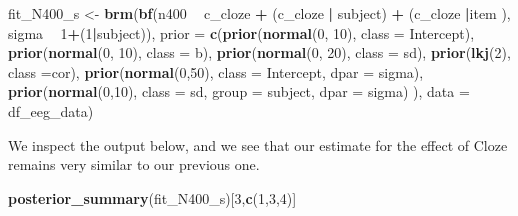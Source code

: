 \documentclass[12pt,]{krantz}
\newenvironment{Shaded}{\begin{snugshade}}{\end{snugshade}}
\newcommand{\DataTypeTok}[1]{\textcolor[rgb]{0.13,0.29,0.53}{#1}}
\newcommand{\DecValTok}[1]{\textcolor[rgb]{0.00,0.00,0.81}{#1}}
\newcommand{\KeywordTok}[1]{\textcolor[rgb]{0.13,0.29,0.53}{\textbf{#1}}}
\newcommand{\NormalTok}[1]{#1}
\newcommand{\OperatorTok}[1]{\textcolor[rgb]{0.81,0.36,0.00}{\textbf{#1}}}
\newcommand{\StringTok}[1]{\textcolor[rgb]{0.31,0.60,0.02}{#1}}
\theoremstyle{definition}
\theoremstyle{definition}
\theoremstyle{definition}
\theoremstyle{remark}
\begin{document}
\begin{Shaded}
\begin{Highlighting}[]
\NormalTok{fit_N400_s <-}\StringTok{ }\KeywordTok{brm}\NormalTok{(}\KeywordTok{bf}\NormalTok{(n400 }\OperatorTok{~}\StringTok{ }\NormalTok{c_cloze }\OperatorTok{+}\StringTok{ }\NormalTok{(c_cloze }\OperatorTok{|}\StringTok{ }\NormalTok{subject) }\OperatorTok{+}\StringTok{ }\NormalTok{(c_cloze }\OperatorTok{|}\NormalTok{item ),}
\NormalTok{                       sigma }\OperatorTok{~}\StringTok{ }\DecValTok{1}\OperatorTok{+}\NormalTok{(}\DecValTok{1}\OperatorTok{|}\NormalTok{subject)),}
                  \DataTypeTok{prior =}
                      \KeywordTok{c}\NormalTok{(}\KeywordTok{prior}\NormalTok{(}\KeywordTok{normal}\NormalTok{(}\DecValTok{0}\NormalTok{, }\DecValTok{10}\NormalTok{), }\DataTypeTok{class =}\NormalTok{ Intercept),}
                        \KeywordTok{prior}\NormalTok{(}\KeywordTok{normal}\NormalTok{(}\DecValTok{0}\NormalTok{, }\DecValTok{10}\NormalTok{), }\DataTypeTok{class =}\NormalTok{ b),}
                        \KeywordTok{prior}\NormalTok{(}\KeywordTok{normal}\NormalTok{(}\DecValTok{0}\NormalTok{, }\DecValTok{20}\NormalTok{), }\DataTypeTok{class =}\NormalTok{ sd),}
                        \KeywordTok{prior}\NormalTok{(}\KeywordTok{lkj}\NormalTok{(}\DecValTok{2}\NormalTok{), }\DataTypeTok{class =}\NormalTok{cor),}
                        \KeywordTok{prior}\NormalTok{(}\KeywordTok{normal}\NormalTok{(}\DecValTok{0}\NormalTok{,}\DecValTok{50}\NormalTok{), }\DataTypeTok{class =}\NormalTok{ Intercept, }\DataTypeTok{dpar =}\NormalTok{ sigma),}
                        \KeywordTok{prior}\NormalTok{(}\KeywordTok{normal}\NormalTok{(}\DecValTok{0}\NormalTok{,}\DecValTok{10}\NormalTok{), }\DataTypeTok{class =}\NormalTok{ sd, }\DataTypeTok{group =}\NormalTok{ subject, }
                              \DataTypeTok{dpar =}\NormalTok{ sigma)}
\NormalTok{                        ),}
                  \DataTypeTok{data =}\NormalTok{ df_eeg_data)}
\end{Highlighting}
\end{Shaded}

We inspect the output below, and we see that our estimate for the effect of Cloze
remains very similar to our previous one.

\begin{Shaded}
\begin{Highlighting}[]
\KeywordTok{posterior_summary}\NormalTok{(fit_N400_s)[}\DecValTok{3}\NormalTok{,}\KeywordTok{c}\NormalTok{(}\DecValTok{1}\NormalTok{,}\DecValTok{3}\NormalTok{,}\DecValTok{4}\NormalTok{)]}
\end{Highlighting}
\end{Shaded}
\end{document}
